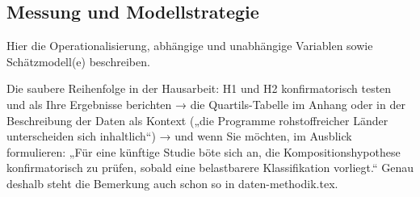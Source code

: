 \subsection{Messung und Modellstrategie}
Hier die Operationalisierung, abhängige und unabhängige Variablen sowie Schätzmodell(e) beschreiben.

Die saubere Reihenfolge in der Hausarbeit: H1 und H2 konfirmatorisch testen und als Ihre Ergebnisse berichten → die Quartils-Tabelle im Anhang oder in der Beschreibung der Daten als Kontext („die Programme rohstoffreicher Länder unterscheiden sich inhaltlich“) → und wenn Sie möchten, im Ausblick formulieren: „Für eine künftige Studie böte sich an, die Kompositionshypothese konfirmatorisch zu prüfen, sobald eine belastbarere Klassifikation vorliegt.“ Genau deshalb steht die Bemerkung auch schon so in daten-methodik.tex.

